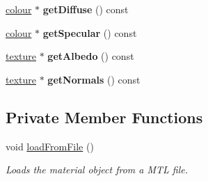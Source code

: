 \begin{DoxyCompactItemize}
\mbox{\label{classflounder_1_1material_aa0437ef7b814e0b1016cc0b836c5ff3e}} 
\hyperlink{classflounder_1_1colour}{colour} $\ast$ {\bfseries get\+Diffuse} () const
\item 
\mbox{\label{classflounder_1_1material_a3801707d870dc20abe2cf8a0ffb31907}} 
\hyperlink{classflounder_1_1colour}{colour} $\ast$ {\bfseries get\+Specular} () const
\item 
\mbox{\label{classflounder_1_1material_a4c59c999853e20a0d85dc9650e1f55ca}} 
\hyperlink{classflounder_1_1texture}{texture} $\ast$ {\bfseries get\+Albedo} () const
\item 
\mbox{\label{classflounder_1_1material_aff2dad52e467597b63c41a048f2a2a91}} 
\hyperlink{classflounder_1_1texture}{texture} $\ast$ {\bfseries get\+Normals} () const
\end{DoxyCompactItemize}
\subsection*{Private Member Functions}
\begin{DoxyCompactItemize}
\item 
void \hyperlink{classflounder_1_1material_a8f2af341dd47838604eee5a7f9157c31}{load\+From\+File} ()
\begin{DoxyCompactList}\small\item\em Loads the material object from a M\+TL file. \end{DoxyCompactList}\end{DoxyCompactItemize}
